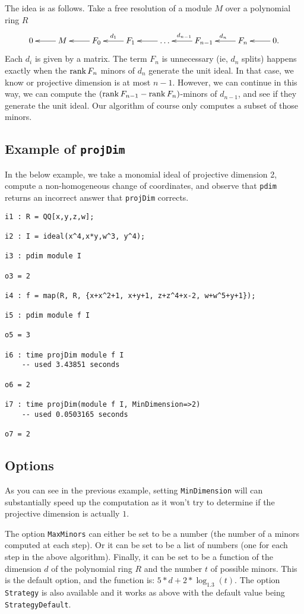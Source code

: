 \documentclass[11pt]{amsart}
\begin{document}
The idea is as follows.  Take a free resolution of a module $M$ over a polynomial ring $R$  
\[
  \xymatrix{
  0 & \ar[l] M  & \ar[l] F_0 & \ar[l]_{d_1} F_1 & \ar[l] \dots & \ar[l]_{d_{n-1}} F_{n-1}  & \ar[l]_{d_n} F_n & \ar[l] 0.  
  }
\] 
Each $d_i$ is given by a matrix.  The term $F_n$ is unnecessary (ie, $d_n$ splits) happens exactly when the $\operatorname{{rank}} F_n$ minors of $d_n$ generate the unit ideal.  In that case, we know or projective dimension is at most $n-1$.  However, we can continue in this way, we can compute the $(\operatorname{{rank}} F_{n-1} - \operatorname{{rank}} F_n)$-minors of $d_{n-1}$, and see if they generate the unit ideal.  Our algorithm of course only computes a subset of those minors.

\subsection{Example of {\tt projDim}}
In the below example, we take a monomial ideal of projective dimension 2, compute a non-homogeneous change of coordinates, and observe that {\tt pdim} returns an incorrect answer that {\tt projDim} corrects.

{\small\color{blue}
\begin{verbatim}
i1 : R = QQ[x,y,z,w];

i2 : I = ideal(x^4,x*y,w^3, y^4);

i3 : pdim module I

o3 = 2

i4 : f = map(R, R, {x+x^2+1, x+y+1, z+z^4+x-2, w+w^5+y+1});

i5 : pdim module f I

o5 = 3

i6 : time projDim module f I
    -- used 3.43851 seconds

o6 = 2

i7 : time projDim(module f I, MinDimension=>2)
    -- used 0.0503165 seconds

o7 = 2
\end{verbatim}
}

\subsection{Options}

As you can see in the previous example, setting {\tt MinDimension} will can substantially speed up the computation as it won't try to determine if the projective dimension is actually $1$.  

The option {\tt MaxMinors} can either be set to be a number (the number of a minors computed at each step).  Or it can be set to be a list of numbers (one for each step in the above algorithm).  Finally, it can be set to be a function of the dimension $d$ of the polynomial ring $R$ and the number $t$ of possible minors.  This is the default option, and the function is:  $5*d + 2*\log_{1.3}(t)$.
The option {\tt Strategy} is also available and it works as above with the default value being {\tt StrategyDefault}.
\end{document}
